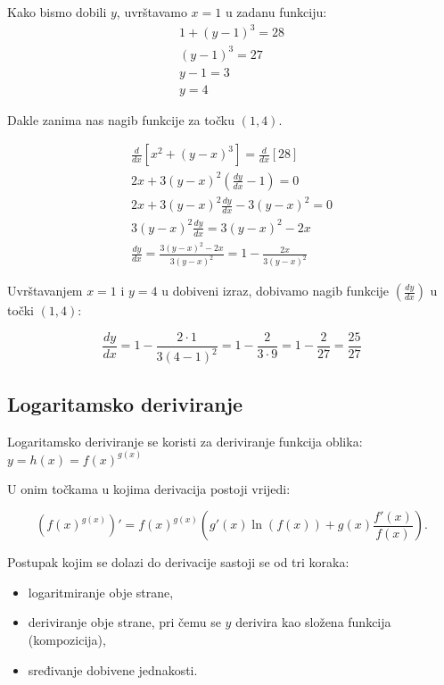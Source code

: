 \begin{multicols}{2}
Kako bismo dobili $y$, uvrštavamo $x=1$ u zadanu funkciju:
\begin{gather*}
    1+(y-1)^3 = 28\\
    (y-1)^3 = 27\\
    y-1 = 3\\
    y = 4
\end{gather*}

Dakle zanima nas nagib funkcije za točku $(1,4)$.

\begin{gather*}
    \frac{d}{dx}\left[x^2+(y-x)^3\right]=\frac{d}{dx}\left[28\right]\\
    2x+3(y-x)^2\left(\frac{dy}{dx} - 1\right) = 0\\
    2x+3(y-x)^2\frac{dy}{dx} - 3(y-x)^2 = 0\\
    3(y-x)^2\frac{dy}{dx} = 3(y-x)^2 - 2x\\
    \frac{dy}{dx} = \frac{3(y-x)^2 - 2x}{3(y-x)^2} = 1 - \frac{2x}{3(y-x)^2}
\end{gather*}

Uvrštavanjem $x=1$ i $y=4$ u dobiveni izraz, dobivamo nagib funkcije $(\frac{dy}{dx})$ u točki $(1,4)$:

$$
\frac{dy}{dx} = 1 - \frac{2\cdot 1}{3(4-1)^2} = 1 - \frac{2}{3\cdot 9} = 1 - \frac{2}{27} = \frac{25}{27}
$$

\end{multicols}

\newpage

\subsection{Logaritamsko deriviranje}

Logaritamsko deriviranje se koristi za deriviranje funkcija oblika: $\displaystyle
y=h(x)=f(x)^{g(x)}
$

U onim točkama u kojima derivacija postoji vrijedi:

$$
\left(f(x)^{g(x)}\right)' = f(x)^{g(x)}\left(g'(x)\ln(f(x))+g(x)\frac{f'(x)}{f(x)}\right).
$$

Postupak kojim se dolazi do derivacije sastoji se od tri koraka:
\begin{itemize}
    \item logaritmiranje obje strane,
    \item deriviranje obje strane, pri čemu se $y$ derivira kao složena funkcija (kompozicija),
    \item sređivanje dobivene jednakosti.
\end{itemize}

